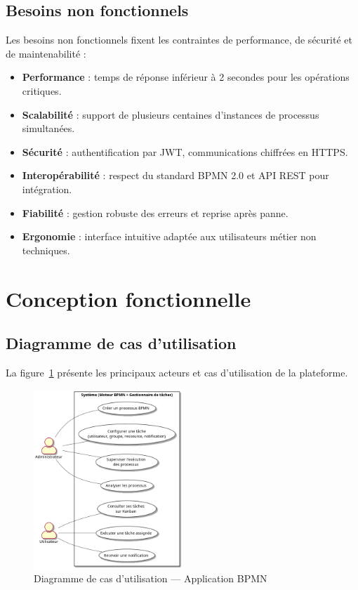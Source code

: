 \subsection{Besoins non fonctionnels}
Les besoins non fonctionnels fixent les contraintes de performance, de sécurité et de maintenabilité :
\begin{itemize}
    \item \textbf{Performance} : temps de réponse inférieur à 2 secondes pour les opérations critiques.
    \item \textbf{Scalabilité} : support de plusieurs centaines d’instances de processus simultanées.
    \item \textbf{Sécurité} : authentification par JWT, communications chiffrées en HTTPS.
    \item \textbf{Interopérabilité} : respect du standard BPMN 2.0 et API REST pour intégration.
    \item \textbf{Fiabilité} : gestion robuste des erreurs et reprise après panne.
    \item \textbf{Ergonomie} : interface intuitive adaptée aux utilisateurs métier non techniques.
\end{itemize}

\section{Conception fonctionnelle}

\subsection{Diagramme de cas d’utilisation}
La figure~\ref{fig:uc_bpmn_app} présente les principaux acteurs et cas d'utilisation de la plateforme.  
\begin{figure}[h]
    \centering
    \includegraphics[width=0.5\textwidth]{Images/usecase.png}
    \caption{Diagramme de cas d'utilisation — Application BPMN}
    \label{fig:uc_bpmn_app}
\end{figure}

